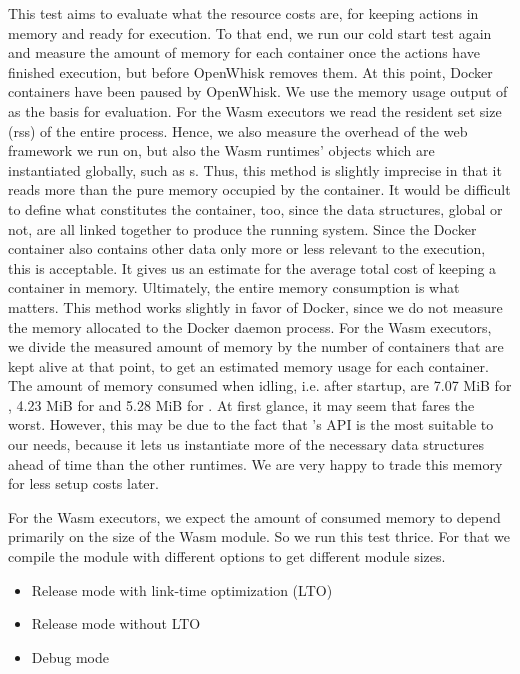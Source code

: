 This test aims to evaluate what the resource costs are, for keeping actions in memory and ready for execution.
To that end, we run our cold start test again and measure the amount of memory for each container once the actions have finished execution, but before OpenWhisk removes them. At this point, Docker containers have been paused by OpenWhisk. We use the memory usage output of  as the basis for evaluation. For the Wasm executors we read the resident set size (rss) of the entire process. Hence, we also measure the overhead of the web framework we run on, but also the Wasm runtimes' objects which are instantiated globally, such as s. Thus, this method is slightly imprecise in that it reads more than the pure memory occupied by the container. It would be difficult to define what constitutes the container, too, since the data structures, global or not, are all linked together to produce the running system. Since the Docker container also contains other data only more or less relevant to the execution, this is acceptable. It gives us an estimate for the average total cost of keeping a container in memory. Ultimately, the entire memory consumption is what matters. This method works slightly in favor of Docker, since we do not measure the memory allocated to the Docker daemon process.
For the Wasm executors, we divide the measured amount of memory by the number of containers that are kept alive at that point, to get an estimated memory usage for each container. The amount of memory consumed when idling, i.e. after startup, are 7.07 MiB for , 4.23 MiB for  and 5.28 MiB for . At first glance, it may seem that  fares the worst. However, this may be due to the fact that 's API is the most suitable to our needs, because it lets us instantiate more of the necessary data structures ahead of time than the other runtimes. We are very happy to trade this memory for less setup costs later. 


For the Wasm executors, we expect the amount of consumed memory to depend primarily on the size of the Wasm module.
So we run this test thrice. For that we compile the  module with different options to get different module sizes.

\begin{itemize}
    \item Release mode with link-time optimization (LTO)
    \item Release mode without LTO
    \item Debug mode
\end{itemize}

